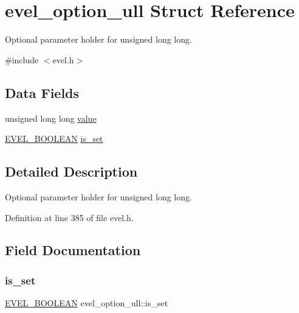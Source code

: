 \hypertarget{structevel__option__ull}{}\section{evel\+\_\+option\+\_\+ull Struct Reference}
\label{structevel__option__ull}


Optional parameter holder for unsigned long long.  




{\ttfamily \#include $<$evel.\+h$>$}

\subsection*{Data Fields}
\begin{DoxyCompactItemize}
\item 
unsigned long long \hyperlink{structevel__option__ull_a124affbc97975bbf896e9801fed819d6}{value}
\item 
\hyperlink{evel_8h_af6468c18baf048a7617b485eb432197e}{E\+V\+E\+L\+\_\+\+B\+O\+O\+L\+E\+AN} \hyperlink{structevel__option__ull_adcc1442175ef13b717d51a30128b23c1}{is\+\_\+set}
\end{DoxyCompactItemize}


\subsection{Detailed Description}
Optional parameter holder for unsigned long long. 

Definition at line 385 of file evel.\+h.



\subsection{Field Documentation}
\hypertarget{structevel__option__ull_adcc1442175ef13b717d51a30128b23c1}{}\label{structevel__option__ull_adcc1442175ef13b717d51a30128b23c1} 
\subsubsection{\texorpdfstring{is\+\_\+set}{is\_set}}
{\footnotesize\ttfamily \hyperlink{evel_8h_af6468c18baf048a7617b485eb432197e}{E\+V\+E\+L\+\_\+\+B\+O\+O\+L\+E\+AN} evel\+\_\+option\+\_\+ull\+::is\+\_\+set}



